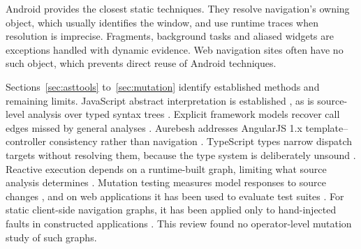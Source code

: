 Android provides the closest static techniques. They resolve navigation's owning object,
which usually identifies the window, and use runtime traces when resolution is imprecise.
Fragments, background tasks and aliased widgets are exceptions handled with dynamic evidence.
Web navigation sites often have no such object, which prevents direct reuse of Android
techniques.

Sections~\ref{sec:asttools} to~\ref{sec:mutation} identify established methods and remaining
limits. JavaScript abstract interpretation is established \cite{jensen2009type}, as is
source-level analysis over typed syntax trees \cite{baxter1998clone,pawlak2016spoon}.
Explicit framework models recover call edges missed by general analyses
\cite{sridharan2011f4f,antoniadis2020enterprise,chen2022jasmine}. Aurebesh addresses AngularJS
1.x template--controller consistency rather than navigation \cite{ocariza2015detecting}.
TypeScript types narrow dispatch targets without resolving them, because the type system is
deliberately unsound \cite{bierman2014understanding,richards2015concrete}. Reactive execution
depends on a runtime-built graph, limiting what source analysis determines
\cite{cooper2006embedding,banken2018debugging}. Mutation testing measures model responses to
source changes \cite{jia2011mutation,papadakis2019mutation}, and on web applications it has been
used to evaluate test suites \cite{mirshokraie2013efficient,praphamontripong2010applying}. For
static client-side navigation graphs, it has been applied only to hand-injected faults in
constructed applications \cite{oshima2018model}. This review found no operator-level mutation
study of such graphs.
